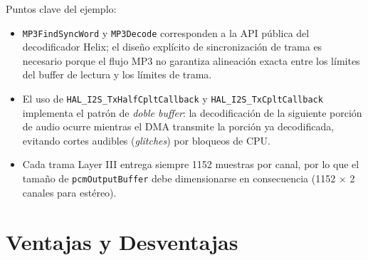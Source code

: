 \documentclass[pdflatex,sn-mathphys-num]{sn-jnl}%
\begin{document}
Puntos clave del ejemplo:
\begin{itemize}
    \item \texttt{MP3FindSyncWord} y \texttt{MP3Decode} corresponden a la API pública del decodificador Helix; el diseño explícito de sincronización de trama es necesario porque el flujo MP3 no garantiza alineación exacta entre los límites del buffer de lectura y los límites de trama.
    \item El uso de \texttt{HAL\_I2S\_TxHalfCpltCallback} y \texttt{HAL\_I2S\_TxCpltCallback} implementa el patrón de \textit{doble buffer}: la decodificación de la siguiente porción de audio ocurre mientras el DMA transmite la porción ya decodificada, evitando cortes audibles (\textit{glitches}) por bloqueos de CPU.
    \item Cada trama Layer III entrega siempre 1152 muestras por canal, por lo que el tamaño de \texttt{pcmOutputBuffer} debe dimensionarse en consecuencia (1152 $\times$ 2 canales para estéreo).
\end{itemize}

\section{Ventajas y Desventajas}\label{sec:proscons}
\end{document}
